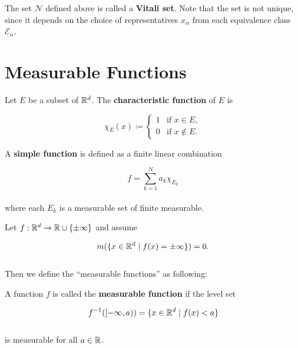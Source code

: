 \documentclass[12pt, a4paper, openany, twoside]{book}
\theoremstyle{definition}
\theoremstyle{remark}
\theoremstyle{plain}
\numberwithin{equation}{section}
\begin{document}
The set $\mathcal{N}$ defined above is called a \textbf{Vitali set}. Note that the set is not unique, since it depends on the choice of representatives $x_\alpha$ from each equivalence class $\mathcal{E}_\alpha$.




\newpage
\section{Measurable Functions}
\vspace{5mm}
\begin{tcolorbox}[colback=yellow!10!white,colframe=blue!75!black,title=Definition 1.4.1]\label{Definition 1.4.1}
    Let $E$ be a subset of ${\mathbb {R}}^d$. The \textbf{characteristic function} of $E$ is 

    \[\chi_{E}(x)\coloneqq\begin{cases}
        1 & \text{if $x\in E$},\\
        0 & \text{if $x\notin E$}.
    \end{cases}\]
\end{tcolorbox}
\vspace{5mm}
\begin{tcolorbox}[colback=yellow!10!white,colframe=blue!75!black,title=Definition 1.4.2]\label{Definition 1.4.2}
    A \textbf{simple function} is defined as a finite linear combination 

    \[f=\sum_{k=1}^{N}{a_k\chi_{E_k}}\]
    \\
    where each $E_k$ is a measurable set of finite measurable.
\end{tcolorbox}
\vspace{5mm}

Let $f:{\mathbb {R}}^d\rightarrow {\mathbb {R}}\cup\{\pm\infty\}$ and assume

\[m(\{x\in{\mathbb {R}}^d \mid f(x)=\pm\infty\})=0.\]
\\
Then we define the ``measurable functions'' as following:

\vspace{5mm}
\begin{tcolorbox}[colback=yellow!10!white,colframe=blue!75!black,title=Definition 1.4.3]\label{Definition 1.4.3}
    A function $f$ is called the \textbf{measurable function} if the level set 

    \[f^{-1}([-\infty,a))=\{x\in {\mathbb {R}}^d \mid f(x)<a\}\]
    \\
    is measurable for all $a\in{\mathbb {R}}$.
\end{tcolorbox}
\vspace{5mm}
\end{document}
